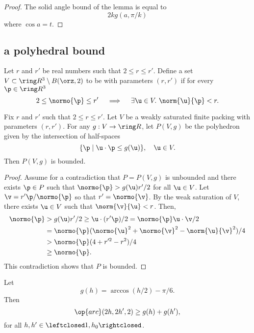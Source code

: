 \begin{cnl}
\begin{proof}
The solid angle bound of the lemma is equal to 
\[  
2 k g(a,\pi/k)
\] 
where $\cos a=t$.  
\end{proof}


\subsection{a polyhedral bound}\label{a polyhedral bound}

\begin{definition}
\label{def:weakly-saturated}
%
Let $r$ and $r'$ be real numbers such that $2\le r\le r'$.  Define a
set $ V\subset\vecR{3}\setminus \openBall{\orz}{2}$ to be  with parameters $(r,r')$ if for every $\p\in\vecR{3}$
\[  
2\le\normo{\p}\le r'~~~\implies~~~ \exists \u\in V.~\norm{ \u}{\p}< r.
\] 
\end{definition}


\begin{lemma}[]
\label{lemma:poly-bounded} 
%
Fix $r$ and $r'$ such that $2\le r\le r'$.
Let $ V$ be a weakly saturated finite packing with parameters $(r,r')$.
For any $g: V\to\Real$, let $P( V,g)$ be the
polyhedron given by the intersection of half-spaces
\[  
\setcomp{\p }{  \u\cdot \p \le g( \u)},\quad \u\in V.
\] 
Then $P( V,g)$ is bounded.
\end{lemma}


\begin{proof} Assume for a contradiction that $P=P( V,g)$ is unbounded
  and there exists $\p\in P$ such that $\normo{\p} > g( \u) r'/2$ for
  all $ \u\in V$.  Let $\v = r' \p/\normo{\p}$ so that
  $r'=\normo{\v}$.  By the weak saturation of $ V$, there exists $
  \u\in V$ such that $\norm{\v}{ \u}<r$.  Then,
\begin{align*} 
\normo{\p} &> g( \u) r'/2 \ge  
\u\cdot (r' \p)/2 = \normo{\p}  \u\cdot \v /2\\
&= \normo{\p} (\normo{ \u}^2 + \normo{\v}^2 - \norm{ \u}{\v}^2)/4\\
&> \normo{\p}(4+r'^2-r^2)/4\\
&\ge \normo{\p}.
\end{align*}
This contradiction shows that $P$ is bounded.
\end{proof}

\begin{lemma}
\label{lemma:g-ineq}
%
Let 
\[ 
g(h) = \arccos(h/2) - \pi/6.
\] 
Then
\begin{equation}\label{eqn:disks} 
\op{arc}(2h,2h',2)\ge g(h) + g(h') ,%
\end{equation}%
for all $h,h'\in\leftclosed 1,h_0\rightclosed$.
\end{lemma}


\end{cnl}
